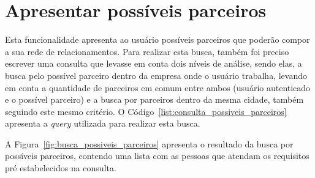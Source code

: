 \section{Apresentar possíveis parceiros}

\par Esta funcionalidade apresenta ao usuário possíveis parceiros que poderão compor a sua rede de relacionamentos. Para realizar esta busca, também foi preciso escrever uma consulta que levasse em conta dois níveis de análise, sendo elas, a busca pelo possível parceiro dentro da empresa onde o usuário trabalha, levando em conta a quantidade de parceiros em comum entre ambos (usuário autenticado e o possível parceiro) e a busca por parceiros dentro da mesma cidade, também seguindo este mesmo critério. O Código~\ref{list:consulta_possiveis_parceiros} apresenta a \textit{query} utilizada para realizar esta busca.





\par A Figura~\ref{fig:busca_possiveis_parceiros} apresenta o resultado da busca por possíveis parceiros, contendo uma lista com as pessoas que atendam os requisitos pré estabelecidos na consulta.

